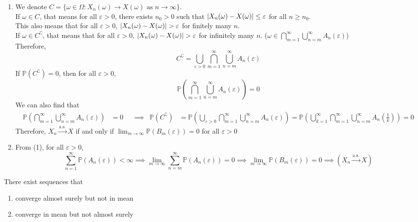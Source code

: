 \documentclass{huhtakm-template-book}
\newcommand{\prob}{\mathbb{P}}
\begin{document}
\begin{proofing}
	\begin{enumerate}
		\item We denote $C=\{\omega\in\Omega:X_{n}(\omega)\to X(\omega)\text{ as }n\to\infty\}$.\\
		If $\omega\in C$, that means for all $\varepsilon>0$, there exists $n_{0}>0$ such that $\left|{X_{n}(\omega)-X(\omega)}\right|\leq\varepsilon$ for all $n\geq n_{0}$.\\
		This also means that for all $\varepsilon>0$, $\abs{X_{n}(\omega)-X(\omega)}>\varepsilon$ for finitely many $n$.\\
		If $\omega\in C^{\complement}$, that means that for all $\varepsilon>0$, $\abs{X_{n}(\omega)-X(\omega)}>\varepsilon$ for infinitely many $n$. ($\omega\in\bigcap_{m=1}^{\infty}\bigcup_{n=m}^{\infty}A_{n}(\varepsilon)$)\\
		Therefore,
		\begin{equation*}
			C^{\complement}=\bigcup_{\varepsilon>0}\bigcap_{m=1}^{\infty}\bigcup_{n=m}^{\infty}A_{n}(\varepsilon)
		\end{equation*}
		If $\prob(C^{\complement})=0$, then for all $\varepsilon>0$,
		\begin{equation*}
			\prob\left(\bigcap_{m=1}^{\infty}\bigcup_{n=m}^{\infty}A_{n}(\varepsilon)\right)=0
		\end{equation*}
		We can also find that
		\begin{align*}
			\prob\left(\bigcap_{m=1}^{\infty}\bigcup_{n=m}^{\infty}A_{n}(\varepsilon)\right)&=0 & &\implies & \prob(C^{\complement})&=\prob\left(\bigcup_{\varepsilon>0}\bigcap_{m=1}^{\infty}\bigcup_{n=m}^{\infty}A_{n}(\varepsilon)\right)=\prob\left(\bigcup_{k=1}^{\infty}\bigcap_{m=1}^{\infty}\bigcup_{n=m}^{\infty}A_{n}\left(\frac{1}{k}\right)\right)=0
		\end{align*}
		Therefore, $X_{n}\xrightarrow{\text{a.s.}}X$ if and only if $\lim_{m\to\infty}\prob(B_{m}(\varepsilon))=0$ for all $\varepsilon>0$
		\item From (1), for all $\varepsilon>0$,
		\begin{equation*}
			\sum_{n=1}^{\infty}\prob(A_{n}(\varepsilon))<\infty\implies\lim_{m\to\infty}\sum_{n=m}^{\infty}\prob(A_{n}(\varepsilon))=0\implies\lim_{m\to\infty}\prob(B_{m}(\varepsilon))=0\implies(X_{n}\xrightarrow{\text{a.s.}}X)
		\end{equation*}
	\end{enumerate}
\end{proofing}
\begin{lem}
	\label{Chapter 8 (Lemma) Non-relationship between almost surely convergence and mean}
	There exist sequences that
	\begin{enumerate}
		\item converge almost surely but not in mean
		\item converge in mean but not almost surely
	\end{enumerate}
\end{lem}
\end{document}
